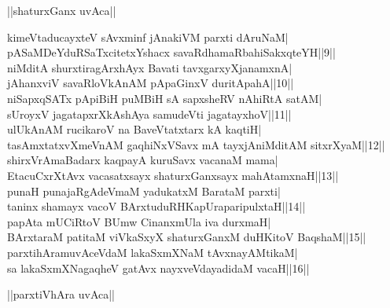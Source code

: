 \documentclass{article}
\begin{document}
\begin{center}
||shaturxGanx uvAca||
\end{center}

kimeVtaducayxteV sAvxminf jAnakiVM parxti dAruNaM|\\
pASaMDeYduRSaTxcitetxYshacx savaRdhamaRbahiSakxqteYH||9||\\
niMditA shurxtiragArxhAyx Bavati tavxgarxyXjanamxnA|\\
jAhanxviV savaRloVkAnAM pApaGinxV duritApahA||10||\\
niSapxqSATx pApiBiH puMBiH sA sapxsheRV nAhiRtA satAM|\\
sUroyxV jagatapxrXkAshAya samudeVti jagatayxhoV||11||\\
ulUkAnAM rucikaroV na BaveVtatxtarx kA kaqtiH|\\
tasAmxtatxvXmeVnAM gaqhiNxVSavx mA tayxjAniMditAM sitxrXyaM||12||\\
shirxVrAmaBadarx kaqpayA kuruSavx vacanaM mama|\\
EtacuCxrXtAvx vacasatxsayx shaturxGanxsayx mahAtamxnaH||13||\\
punaH punajaRgAdeVmaM yadukatxM BarataM parxti|\\
taninx shamayx vacoV BArxtuduRHKapUraparipulxtaH||14||\\
papAta mUCiRtoV BUmw CinanxmUla iva durxmaH|\\
BArxtaraM patitaM viVkaSxyX shaturxGanxM duHKitoV BaqshaM||15||\\
parxtihAramuvAceVdaM lakaSxmXNaM tAvxnayAMtikaM|\\
sa lakaSxmXNagaqheV gatAvx nayxveVdayadidaM vacaH||16||\\

\begin{center}
||parxtiVhAra uvAca||
\end{center}
\end{document}
